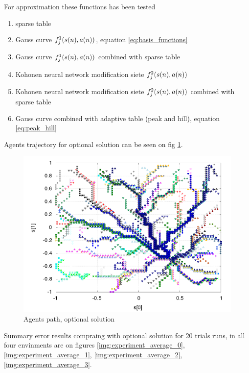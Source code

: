 \documentclass{acmbulletin}
\begin{document}
For approximation these functions has been tested

\begin{enumerate}
\item sparse table
\item Gauss curve $f_j^1(\boldmath{s(n), a(n)})$, equation \ref{eq:basis_functions}
\item Gauss curve $f_j^1(\boldmath{s(n), a(n)})$ combined with sparse table
\item Kohonen neural network modification siete $f_j^2(\boldmath{s(n), a(n)})$
\item Kohonen neural network modification siete $f_j^2(\boldmath{s(n), a(n)})$ combined with sparse table
\item Gauss curve combined with adaptive table (peak and hill), equation \ref{eq:peak_hill}
\end{enumerate}

Agents trajectory for optional solution can be seen on fig \ref{img:experiment_ref_path}.

\begin{figure}[!htb]
\centering
\includegraphics[scale=.3]{../../results_q_learning/map_2/function_type_0/iterations_10/agents_path_surface.png}
\caption{Agents path, optional solution}
\label{img:experiment_ref_path}
\end{figure}



Summary error results compraing with optional solution for 20 trials runs, in all four envinments are on figures
\ref{img:experiment_average_0},
\ref{img:experiment_average_1},
\ref{img:experiment_average_2},
\ref{img:experiment_average_3}.
\end{document}
